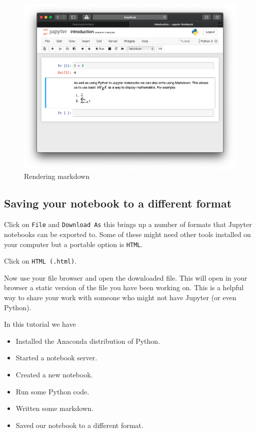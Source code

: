 \begin{figure}[htbp]
\centering
    \includegraphics[width=0.750\linewidth]{assets/rendering_markdown/main.png}
    \caption{Rendering markdown}\label{fig:rendering_markdown}
\end{figure}

\subsection{Saving your notebook to a different format}

Click on \texttt{File} and \texttt{Download As} this brings up a number of formats that
Jupyter notebooks can be exported to. Some of these might need other tools
installed on your computer but a portable option is \texttt{HTML}.


Click on \texttt{HTML (.html)}.


Now use your file browser and open the downloaded file. This will open in your
browser a static version of the file you have been working on. This is a helpful
way to share your work with someone who might not have Jupyter (or even Python).

In this tutorial we have
\begin{itemize}
\item 

Installed the Anaconda distribution of Python.

\item 

Started a notebook server.

\item 

Created a new notebook.

\item 

Run some Python code.

\item 

Written some markdown.

\item 

Saved our notebook to a different format.

\end{itemize}




